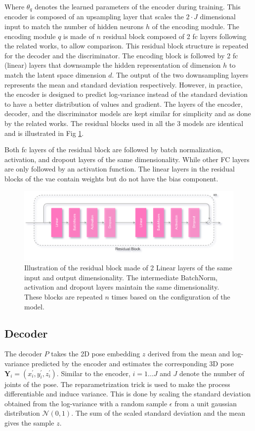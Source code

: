 Where $\theta_q$ denotes the learned parameters of the encoder during training. This encoder is composed of an upsampling layer that scales the $2\!\cdot\!J$ dimensional input to match the number of hidden neurons $h$ of the encoding module. The encoding module $q$ is made of $n$ residual block composed of 2 \ac{fc} layers following the related works, to allow comparison. This residual block structure is repeated for the decoder and the discriminator. The encoding block is followed by 2 \ac{fc} (linear) layers that downsample the hidden representation of dimension $h$ to match the latent space dimension $d$. The output of the two downsampling layers represents the mean and standard deviation respectively. However, in practice, the encoder is designed to predict log-variance instead of the standard deviation to have a better distribution of values and gradient. The layers of the encoder, decoder, and the discriminator models are kept similar for simplicity and as done by the related works. The residual blocks used in all the 3 models are identical and is illustrated in Fig \ref{fig:residual_block}.

Both \ac{fc} layers of the residual block are followed by batch normalization, activation, and dropout layers of the same dimensionality. While other \ac{FC} layers are only followed by an activation function. The linear layers in the residual blocks of the \ac{vae} contain weights but do not have the bias component.


\begin{figure}[h] 
    \centering
    \includegraphics[width=\textwidth]{figures/arch/res_block.png}
    \caption{Illustration of the residual block made of 2 Linear layers of the same input and output dimensionality. The intermediate BatchNorm, activation and dropout layers maintain the same dimensionality. These blocks are repeated $n$ times based on the configuration of the model.
    }
    \label{fig:residual_block}
\end{figure}

\subsection{Decoder}
The decoder $P$ takes the 2D pose embedding $z$ derived from the mean and log-variance predicted by the encoder and estimates the corresponding 3D pose $\textbf{Y}_i = (x^\prime_i, y^\prime_i, z^\prime_i)$. Similar to the encoder, $i = 1 ... J$ and $J$ denote the number of joints of the pose. The reparametrization trick is used to make the process differentiable and induce variance. This is done by scaling the standard deviation obtained from the log-variance with a random sample $\epsilon$ from a unit gaussian distribution $\mathcal{N}(0,1)$. The sum of the scaled standard deviation and the mean gives the sample $z$.

